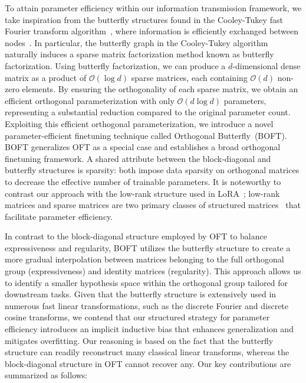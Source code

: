 To attain parameter efficiency within our information transmission framework, we take inspiration from the butterfly structures found in the Cooley-Tukey fast Fourier transform algorithm~\cite{cooley1965algorithm}, where information is efficiently exchanged between nodes~\cite{klasing1994broadcasting}. In particular, the butterfly graph in the Cooley-Tukey algorithm naturally induces a sparse matrix factorization method known as butterfly factorization. Using butterfly factorization, we can produce a $d$-dimensional dense matrix as a product of $\mathcal{O}(\log d)$ sparse matrices, each containing $\mathcal{O}(d)$ non-zero elements. By ensuring the orthogonality of each sparse matrix, we obtain an efficient orthogonal parameterization with only $\mathcal{O}(d \log d)$ parameters, representing a substantial reduction compared to the original parameter count. Exploiting this efficient orthogonal parameterization, we introduce a novel parameter-efficient finetuning technique called Orthogonal Butterfly~(BOFT). BOFT generalizes OFT as a special case and establishes a broad orthogonal finetuning framework. A shared attribute between the block-diagonal and butterfly structures is sparsity: both impose data sparsity on orthogonal matrices to decrease the effective number of trainable parameters. It is noteworthy to contrast our approach with the low-rank structure used in LoRA~\cite{hulora2022}; low-rank matrices and sparse matrices are two primary classes of structured matrices~\cite{candes2011robust} that facilitate parameter efficiency.

In contrast to the block-diagonal structure employed by OFT to balance expressiveness and regularity, BOFT utilizes the butterfly structure to create a more gradual interpolation between matrices belonging to the full orthogonal group (expressiveness) and identity matrices (regularity). This approach allows us to identify a smaller hypothesis space within the orthogonal group tailored for downstream tasks. Given that the butterfly structure is extensively used in numerous fast linear transformations, such as the discrete Fourier and discrete cosine transforms, we contend that our structured strategy for parameter efficiency introduces an implicit inductive bias that enhances generalization and mitigates overfitting. Our reasoning is based on the fact that the butterfly structure can readily reconstruct many classical linear transforms, whereas the block-diagonal structure in OFT cannot recover any. Our key contributions are summarized as follows:

